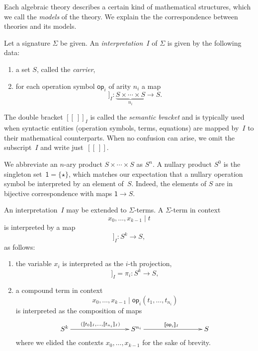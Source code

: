 \documentclass{amsart}
\newcommand{\op}{\mathsf{op}}
\newcommand{\one}{\mathsf{1}}
\newcommand{\sem}[1]{[\![#1]\!]}
\begin{document}
Each algebraic theory describes a certain kind of mathematical structures, which we call
the \emph{models} of the theory. We explain the the correspondence between theories and
its models.

Let a signature $\Sigma$ be given. An \emph{interpretation~$I$} of $\Sigma$ is given by
the following data:
% 
\begin{enumerate}
\item a set $S$, called the \emph{carrier},
\item for each operation symbol $\op_i$ of arity $n_i$ a map
  \begin{equation*}
    \sem{\op_i}_I : \underbrace{S \times \cdots \times S}_{n_i} \to S.
  \end{equation*}
\end{enumerate}
%
The double bracket $\sem{{\ }}_I$ is called the \emph{semantic bracket} and is typically
used when syntactic entities (operation symbols, terms, equations) are mapped by~$I$ to
their mathematical counterparts. When no confusion can arise, we omit the subscript~$I$
and write just~$\sem{{\ }}$.

We abbreviate an $n$-ary product $S \times \cdots \times S$ as $S^n$. A nullary product
$S^0$ is the singleton set~$\one = \{\star\}$, which matches our expectation that a
nullary operation symbol be interpreted by an element of~$S$. Indeed, the elements of $S$
are in bijective correspondence with maps $\one \to S$.

An interpretation~$I$ may be extended to $\Sigma$-terms. A $\Sigma$-term in context
%
\begin{equation*}
  x_0, \ldots, x_{k-1} \mid t
\end{equation*}
%
is interpreted by a map
%
\begin{equation*}
  \sem{x_0, \ldots, x_{k-1} \mid t}_I : S^k \to S,
\end{equation*}
%
as follows:
%
\begin{enumerate}
\item the variable $x_i$ is interpreted as the $i$-th projection,
  \begin{equation*}
    \sem{x_0, \ldots, x_{k-1} \mid  x_i}_I = \pi_i : S^k \to S,
  \end{equation*}
\item a compound term in context
  \begin{equation*}
    x_0, \ldots, x_{k-1} \mid \op_i(t_1, \ldots, t_{n_i})
  \end{equation*}
  is interpreted as the composition of maps
  \begin{equation*}
    \xymatrix@+6em{
      {S^k} \ar[r]^{(\sem{t_0}_I, \ldots, \sem{t_{n_i}}_I)}
      &
      {S^{n_i}} \ar[r]^{\sem{\op_i}_I}
      &
      {S}
    }
  \end{equation*}
  where we elided the contexts $x_0, \ldots, x_{k-1}$ for the sake of brevity.
\end{enumerate}
\end{document}
